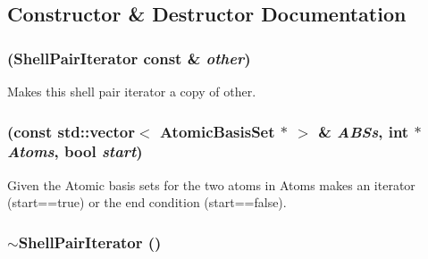 \subsection{Constructor \& Destructor Documentation}
\hypertarget{classJKBuilder_1_1ShellPairIterator_a09d264284681ba51a345d1bf04e73a1a}{
\subsubsection[{ShellPairIterator}]{ ({\bf ShellPairIterator} const \& {\em other})}}
\label{classJKBuilder_1_1ShellPairIterator_a09d264284681ba51a345d1bf04e73a1a}


Makes this shell pair iterator a copy of other. \hypertarget{classJKBuilder_1_1ShellPairIterator_aa348d2d0bd41d0944cf43db3ca6b967f}{
\subsubsection[{ShellPairIterator}]{ (const std::vector$<$ {\bf AtomicBasisSet} $\ast$ $>$ \& {\em ABSs}, \/  int $\ast$ {\em Atoms}, \/  bool {\em start})}}
\label{classJKBuilder_1_1ShellPairIterator_aa348d2d0bd41d0944cf43db3ca6b967f}


Given the Atomic basis sets for the two atoms in Atoms makes an iterator (start==true) or the end condition (start==false). \hypertarget{classJKBuilder_1_1ShellPairIterator_a4374ea1e5f0ed1fad10a7c4cf86f6d90}{
\subsubsection[{$\sim$ShellPairIterator}]{\setlength{\rightskip}{0pt plus 5cm}$\sim${\bf ShellPairIterator} ()}}
\label{classJKBuilder_1_1ShellPairIterator_a4374ea1e5f0ed1fad10a7c4cf86f6d90}


